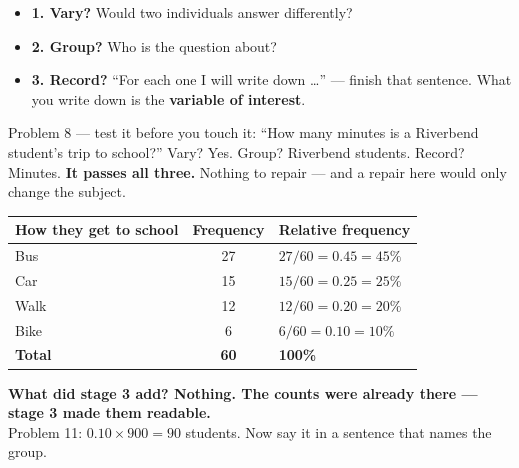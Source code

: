 \documentclass[aspectratio=169, 11pt]{beamer}
\newcommand{\redink}[1]{{\color{redacc}\bfseries #1}}
\begin{document}
\begin{frame}[t, plain]
  \vspace{4pt}
  \begin{itemize}\setlength{\itemsep}{5pt}
    \item \textbf{1. Vary?} Would two individuals answer differently?
    \item \textbf{2. Group?} Who is the question about?
    \item \textbf{3. Record?} ``For each one I will write down \ldots'' --- finish that
          sentence. What you write down is the \textbf{\color{cerulean}variable of interest}.
  \end{itemize}
  \vspace{8pt}
  \begin{block}{Problem 8 --- test it before you touch it: ``How many minutes is a Riverbend student's trip to school?''}
    Vary? Yes. Group? Riverbend students. Record? Minutes. \redink{It passes all three.}
    Nothing to repair --- and a repair here would only change the subject.
  \end{block}
\end{frame}

\begin{frame}[t, plain]
  \vspace{2pt}
  \begin{center}
    \small
    \renewcommand{\arraystretch}{1.25}
    \begin{tabular}{@{} l c l @{}}
    \hline
    \textbf{How they get to school} & \textbf{Frequency} & \textbf{Relative frequency} \\
    \hline
    Bus  & 27 & $27/60 = 0.45 = 45\%$ \\
    Car  & 15 & $15/60 = 0.25 = 25\%$ \\
    Walk & 12 & $12/60 = 0.20 = 20\%$ \\
    Bike &  6 & $6/60 = 0.10 = 10\%$ \\
    \hline
    \textbf{Total} & \textbf{60} & \textbf{100\%} \\
    \hline
    \end{tabular}
  \end{center}
  \vspace{6pt}
  \begin{center}
    {\color{cerulean}\bfseries What did stage 3 add? \redink{Nothing.} The counts were already
    there --- stage 3 made them readable.}\\[4pt]
    {\small Problem 11: $0.10 \times 900 = 90$ students. Now say it in a sentence that names
    the group.}
  \end{center}
\end{frame}
\end{document}
